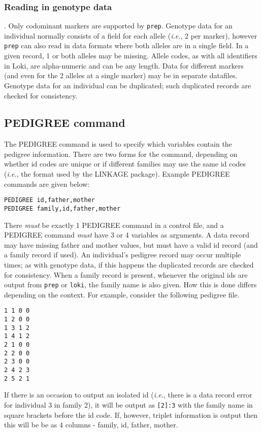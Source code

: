 \documentclass[10pt,a4paper]{article}
\newcommand{\IE}{\textit{i.e.},\xspace}
\newcommand{\Prep}{\texttt{prep}\xspace}
\newcommand{\Loki}{\texttt{loki}\xspace}
\begin{document}
\subsubsection{Reading in genotype data}
\label{genotype_data}. Only codominant markers are supported by \Prep.
Genotype data for an individual normally consists of a field for each allele
(\IE 2 per marker), however \Prep can also read in data formats where both
alleles are in a single field. In a given record, 1 or both alleles may be
missing. Allele codes, as with all identifiers in Loki, are alpha-numeric
and can be any length.  Data for different markers (and even for the 2
alleles at a single marker) may be in separate datafiles.  Genotype data for
an individual can be duplicated; such duplicated records are checked for
consistency.
\subsection{PEDIGREE command}
The PEDIGREE command is used to specify which variables contain the pedigree
information.  There are two forms for the command, depending on whether id
codes are unique or if different families may use the same id codes (\IE the
format used by the LINKAGE package).  Example PEDIGREE commands are given below:
\begin{verbatim}
PEDIGREE id,father,mother  
PEDIGREE family,id,father,mother  
\end{verbatim}
There \emph{must} be exactly 1 PEDIGREE command in a control file, and a
PEDIGREE command \emph{must} have 3 or 4 variables as arguments.  A data record
may have missing father and mother values, but must have a valid id record
(and a family record if used).
An individual's pedigree record may occur multiple times; as with genotype
data, if this happens the duplicated records are checked for consistency.
When a family record is present, whenever the original ids are output from
\Prep or \Loki, the family name is also given.  How this is done differs
depending on the context.  For example, consider the following pedigree file.
\begin{verbatim}
1 1 0 0
1 2 0 0
1 3 1 2
1 4 1 2
2 1 0 0
2 2 0 0
2 3 0 0
2 4 2 3
2 5 2 1
\end{verbatim}
If there is an occasion to output an isolated id (\IE there is a data
record error for individual 3 in family 2), it will be output as \verb+[2]:3+
with the family name in square brackets before the id code.  If, however,
triplet information is output then this will be be as 4 columns - family,
id, father, mother.
\end{document}
